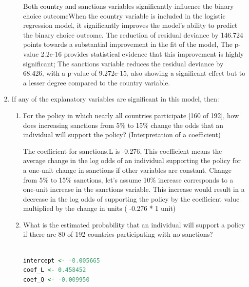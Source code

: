 \documentclass[12pt,letterpaper]{article}
\begin{document}
\begin{enumerate}
\begin{enumerate}
Both country and sanctions variables significantly influence the binary choice outcomeWhen the country variable is included in the logistic regression model, it significantly improves the model's ability to predict the binary choice outcome. The reduction of residual deviance by 146.724 points towards a substantial improvement in the fit of the model, The p-value 2.2e-16  provides statistical evidence that this improvement is highly significant; The sanctions variable reduces the residual deviance by 68.426, with a p-value of 9.272e-15, also showing a significant effect but to a lesser degree compared to the country variable.


	\end{enumerate}
	
	\item
	If any of the explanatory variables are significant in this model, then:
	\begin{enumerate}
		\item
		For the policy in which nearly all countries participate [160 of 192], how does increasing sanctions from 5\% to 15\% change the odds that an individual will support the policy? (Interpretation of a coefficient)

The coefficient for sanctions.L is -0.276. This coefficient means the average change in the log odds of an individual supporting the policy for a one-unit change in sanctions if other variables are constant.	Change from 5\% to 15\% sanctions, let's assume 10\% increase corresponds to a one-unit increase in the sanctions variable. This increase would result in a decrease in the log odds of supporting the policy by the coefficient value multiplied by the change in units (  -0.276 * 1 unit) 

\item
		What is the estimated probability that an individual will support a policy if there are 80 of 192 countries participating with no sanctions? 

  \begin{lstlisting}[language=R] 

intercept <- -0.005665
coef_L <- 0.458452
coef_Q <- -0.009950



\end{lstlisting}
\end{enumerate}
\end{enumerate}
\end{document}
